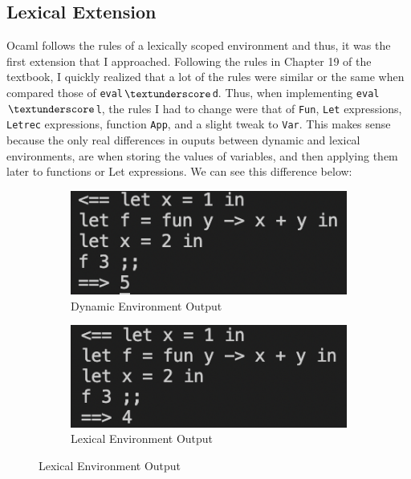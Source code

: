 \documentclass[12pt]{article}
\def\code#1{\texttt{#1}}
\begin{document}
\subsection{Lexical Extension}
Ocaml follows the rules of a lexically scoped environment and thus, it was the first extension that I approached. Following the rules in Chapter 19 of the textbook, I quickly realized that a lot of the rules were similar or the same when compared those of \code{eval$\textunderscore$d}. Thus, when implementing \code{eval$\textunderscore$l}, the rules I had to change were that of \code{Fun}, \code{Let} expressions, \code{Letrec} expressions, function \code{App}, and a slight tweak to \code{Var}. This makes sense because the only real differences in ouputs between dynamic and lexical environments, are when storing the values of variables, and then applying them later to functions or Let expressions. We can see this difference below:
\begin{figure}[h]
  \centering
  
  \begin{subfigure}{0.45\textwidth}
    \includegraphics[width=\linewidth]{Dynamic.png}
    \caption{Dynamic Environment Output}
  \end{subfigure}
  \hfill
  \begin{subfigure}{0.45\textwidth}
    \includegraphics[width=\linewidth]{Lexical.png}
    \caption{Lexical Environment Output}
  \end{subfigure}
\end{figure}
\end{document}

